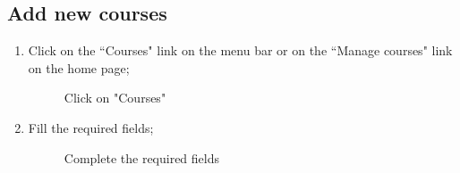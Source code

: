 \documentclass[ManualeUtente]{subfiles}
\begin{document}
	\subsection{Add new courses}
	\begin{enumerate}
		\item Click on the \textquotedblleft Courses" link on the menu bar or on the \textquotedblleft Manage courses" link on the home page;
		\begin{figure}[H]
			\centering
			\caption{Click on "Courses"}
			\label{fig:Click on "Courses"}
		\end{figure} \newpage
		\item Fill the required fields;
		\begin{figure}[H]
			\centering
			\caption{Complete the required fields}
			\label{fig:Complete the required fields}
		\end{figure}

\end{enumerate}
\end{document}
